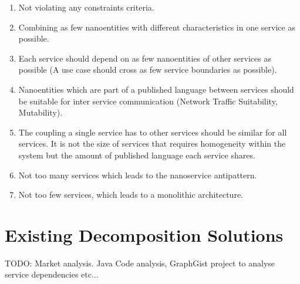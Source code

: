 \begin{enumerate}
	\item Not violating any constraints criteria.
	\item Combining as few nanoentities with different characteristics in one service as possible.
	\item Each service should depend on as few nanoentities of other services as possible (A use case should cross as few service boundaries as possible).
	\item Nanoentities which are part of a published language between services should be suitable for inter service communication (Network Traffic Suitability, Mutability).
	\item The coupling a single service has to other services should be similar for all services. It is not the size of services that requires homogeneity within the system but the amount of published language  each service shares. 
	\item Not too many services which leads to the nanoservice antipattern\cite{nanoservice}.
	\item Not too few services, which leads to a monolithic architecture.
\end{enumerate}

\section{Existing Decomposition Solutions}

TODO: Market analysis. Java Code analysis, GraphGist project to analyse service dependencies etc...






